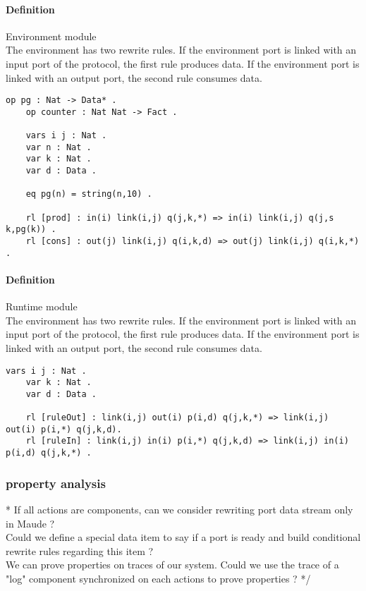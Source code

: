 \documentclass{article}
\theoremstyle{plain}
\theoremstyle{definition}
\begin{document}
\paragraph{Definition} Environment module \\
The environment has two rewrite rules. If the environment port is linked with an input port of the protocol, the first rule produces data.  If the environment port is linked with an output port, the second rule consumes data.
\begin{lstlisting}[style=base] 
	op pg : Nat -> Data* .
	op counter : Nat Nat -> Fact .

	vars i j : Nat .
	var n : Nat .
	var k : Nat .
	var d : Data .
	
	eq pg(n) = string(n,10) .
	
	rl [prod] : in(i) link(i,j) q(j,k,*) => in(i) link(i,j) q(j,s k,pg(k)) .
	rl [cons] : out(j) link(i,j) q(i,k,d) => out(j) link(i,j) q(i,k,*) .
\end{lstlisting}

\paragraph{Definition} Runtime module \\
The environment has two rewrite rules. If the environment port is linked with an input port of the protocol, the first rule produces data.  If the environment port is linked with an output port, the second rule consumes data.
\begin{lstlisting}[style=base] 
	vars i j : Nat .
	var k : Nat .
	var d : Data .

	rl [ruleOut] : link(i,j) out(i) p(i,d) q(j,k,*) => link(i,j) out(i) p(i,*) q(j,k,d). 
	rl [ruleIn] : link(i,j) in(i) p(i,*) q(j,k,d) => link(i,j) in(i) p(i,d) q(j,k,*) . 
\end{lstlisting}


\subsubsection{property analysis}


\/*
If all actions are components, can we consider rewriting port data stream only in Maude ? \\
Could we define a special data item to say if a port is ready and build conditional rewrite rules regarding this item ? \\
We can prove properties on traces of our system. Could we use the trace of a "log" component synchronized on each actions to prove properties ?
*/
\end{document}
